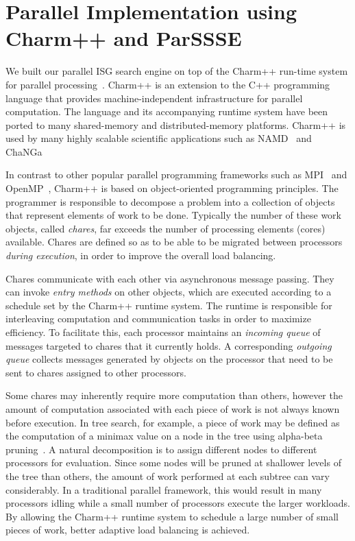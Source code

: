 \documentclass[10pt, conference, compsocconf]{IEEEtran}
\begin{document}
\section{Parallel Implementation using Charm++ and ParSSSE}\label{ParSSSE}
We built our parallel ISG search engine on top of the {\sc Charm++} run-time
system for parallel processing~\cite{kale93charm,kale09charm}.  {\sc Charm++}
is an extension to the C++ programming language that provides
machine-independent infrastructure for parallel computation.  The language and
its accompanying runtime system have been ported to many shared-memory and
distributed-memory platforms. {\sc Charm++} is used by many highly scalable scientific applications such as NAMD~\cite{NAMDIPDPS08} and ChaNGa~\cite{2007_ChaNGaScaling}

In contrast to other popular parallel programming frameworks such as {\sc MPI}~\cite{MPI}
and {\sc OpenMP}~\cite{OpenMP}, {\sc Charm++} is based on object-oriented
programming principles.  The programmer is responsible to decompose a problem
into a collection of objects that represent elements of work to be done.
Typically the number of these work objects, called {\em chares}, far exceeds
the number of processing elements (cores) available.  Chares are defined
so as to be able to be migrated between processors {\em during execution}, in
order to improve the overall load balancing.  

Chares communicate with each other via
asynchronous message passing.  They can invoke {\em entry methods} on other
objects, which are executed according to a schedule set by the {\sc Charm++}
runtime system.  The runtime is responsible for interleaving computation and
communication tasks in order to maximize efficiency.  To facilitate this, each
processor maintains an {\em incoming queue} of messages targeted to chares that
it currently holds.  A corresponding {\em outgoing queue} collects messages
generated by objects on the processor that need to be sent to chares assigned
to other processors.

Some chares may inherently require more computation than others, however the amount
of computation associated with each piece of work is not always known before
execution.  In tree search, for example, a piece of work may be defined as the
computation of a minimax value on a node in the tree using alpha-beta
pruning~\cite{knuth75analysis,baudet78analysis}.  A natural decomposition is to
assign different nodes to different processors for evaluation.  Since some
nodes will be pruned at shallower levels of the tree than others, the amount of
work performed at each subtree can vary considerably.  In a traditional
parallel framework, this would result in many processors idling while a small
number of processors execute the larger workloads. By allowing the {\sc
Charm++} runtime system to schedule a large number of small pieces of work,
better adaptive load balancing is achieved. 
\end{document}
